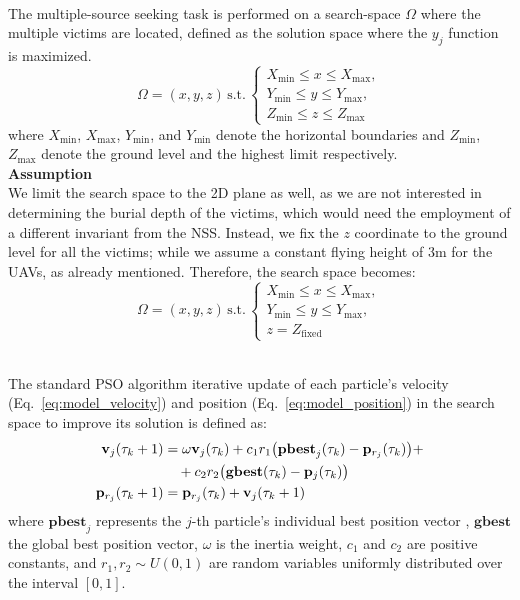 \documentclass[main]{subfiles}
\begin{document}
\noindent\\
The multiple-source seeking task is performed on a search-space $\Omega$ 
where the multiple victims are located, 
defined as the solution space where the $y_j$ function is maximized.
\[
\Omega = (x, y, z) \, \text{s.t.} \,
\begin{cases}
    X_{\min} \leq x \leq X_{\max}, \\
    Y_{\min} \leq y \leq Y_{\max}, \\
    Z_{\min} \leq z \leq Z_{\max}
\end{cases}
\]
where $X_{\min}$, $X_{\max}$, $Y_{\min}$, and $Y_{\min}$ denote the horizontal
boundaries and $Z_{\min}$, $Z_{\max}$ denote the ground level and
the highest limit respectively.
\noindent\\
\textbf{Assumption}\noindent\\
We limit the search space to the 2D plane as well, as we are not interested
in determining the burial depth of the victims, 
which would need the employment of a different 
invariant from the NSS.
Instead, we fix the $z$ coordinate to the ground level for all the victims;
while we assume a constant flying height of 3m for the UAVs, as already mentioned.
Therefore, the search space becomes:
\[
\Omega = (x, y, z) \, \text{s.t.} \,
\begin{cases}
    X_{\min} \leq x \leq X_{\max}, \\
    Y_{\min} \leq y \leq Y_{\max}, \\
    z = Z_{\text{fixed}}
\end{cases}
\]

\noindent\\
The standard PSO algorithm iterative update of each particle's velocity
(Eq.~\ref{eq:model_velocity}) and position (Eq.~\ref{eq:model_position})
in the search space to improve its solution is defined as:
\begin{align}
    \mathbf{v}_{j}(\tau_k+1) &= \omega \mathbf{v}_{j}(\tau_k) 
    + c_1 r_1 \big(\mathbf{pbest}_{j}(\tau_k) - \mathbf{p}_{r_j}(\tau_k)\big) + \notag \\
    &\quad + c_2 r_2 \big(\mathbf{gbest}(\tau_k) - \mathbf{p}_{j}(\tau_k)\big) \label{eq:model_velocity} \\
    \mathbf{p}_{r_j}(\tau_k + 1) &= \mathbf{p}_{r_j}(\tau_k) + \mathbf{v}_{j}(\tau_k+1) \label{eq:model_position}
\end{align}
where $\mathbf{pbest}_j$ represents the $j$-th particle's individual best position vector  
, $\mathbf{gbest}$ the global best position vector, $\omega$ is the inertia weight,
$c_1$ and $c_2$ are positive constants, and $r_1, r_2 \sim \textit{U}(0,1)$ are random variables 
uniformly distributed over the interval $[0, 1]$.
\end{document}
